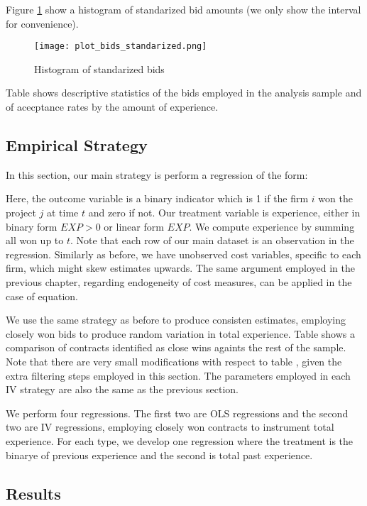 Figure \ref{fig:plot_bids_standarized} show a histogram of standarized bid amounts (we only show the interval  for convenience).

\begin{figure}
  \centering
  \texttt{[image: plot\_bids\_standarized.png]}
  \caption{Histogram of standarized bids}
  \label{fig:plot_bids_standarized}
\end{figure}

Table shows descriptive statistics of the bids employed in the analysis sample and of acecptance rates by the amount of experience.


\subsection{Empirical Strategy}
In this section, our main strategy is perform a regression of the form:

 Here, the outcome variable is a binary indicator which is 1 if the firm $i$ won the project $j$ at time $t$ and zero if not. Our treatment variable is experience, either in binary form $EXP>0$ or linear form $EXP$. We compute experience by summing all won up to $t$. Note that each row of our main dataset is an observation in the regression.
Similarly as before, we have unobserved cost variables, specific to each firm, which might skew estimates upwards. The same argument employed in the previous chapter, regarding endogeneity of cost measures, can be applied in the case of equation.

We use the same strategy as before to produce consisten estimates, employing closely won bids to produce random variation in total experience. Table shows a comparison of contracts identified as close wins againts the rest of the sample. Note that there are very small modifications with respect to table , given the extra filtering steps employed in this section. The parameters employed in each IV strategy are also the same as the previous section.

We perform four regressions. The first two are OLS regressions and the second two are IV regressions, employing closely won contracts to instrument total experience. For each type, we develop one regression where the treatment is the binarye of previous experience and the second is total past experience.

\subsection{Results}

